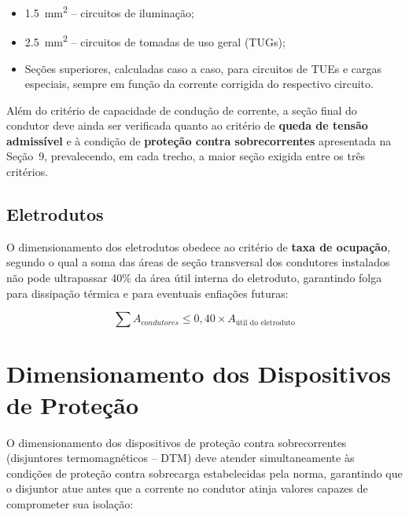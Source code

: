 \documentclass[12pt,openright,oneside,a4paper,brazil]{abntex2}
\begin{document}
\begin{itemize}[leftmargin=1.2cm]
    \item \SI{1,5}{\milli\meter\squared} -- circuitos de iluminação;
    \item \SI{2,5}{\milli\meter\squared} -- circuitos de tomadas de uso
    geral (TUGs);
    \item Seções superiores, calculadas caso a caso, para circuitos de
    TUEs e cargas especiais, sempre em função da corrente corrigida do
    respectivo circuito.
\end{itemize}

Além do critério de capacidade de condução de corrente, a seção final do
condutor deve ainda ser verificada quanto ao critério de \textbf{queda de
tensão admissível} e à condição de \textbf{proteção contra sobrecorrentes}
apresentada na Seção~9, prevalecendo, em cada trecho, a maior seção exigida
entre os três critérios.

\subsection{Eletrodutos}

\hspace{1.27cm} O dimensionamento dos eletrodutos obedece ao critério de \textbf{taxa de
ocupação}, segundo o qual a soma das áreas de seção transversal dos
condutores instalados não pode ultrapassar 40\% da área útil interna do
eletroduto, garantindo folga para dissipação térmica e para eventuais
enfiações futuras:

\begin{equation}
    \sum A_{condutores} \le 0{,}40 \times A_{\text{útil do eletroduto}}
    \label{eq:ocupacao_eletroduto}
\end{equation}

\section{Dimensionamento dos Dispositivos de Proteção}

\hspace{1.27cm}O dimensionamento dos dispositivos de proteção contra sobrecorrentes
(disjuntores termomagnéticos -- DTM) deve atender simultaneamente às
condições de proteção contra sobrecarga estabelecidas pela norma,
garantindo que o disjuntor atue antes que a corrente no condutor atinja
valores capazes de comprometer sua isolação:
\end{document}

